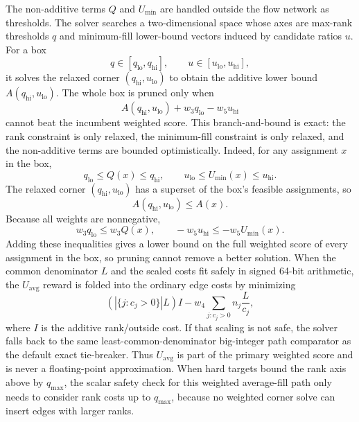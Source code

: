 \documentclass[11pt,a4paper]{article}
\begin{document}
The non-additive terms \(Q\) and \(U_{\min}\) are handled outside the flow
network as thresholds.  The solver searches a two-dimensional space whose
axes are max-rank thresholds \(q\) and minimum-fill lower-bound vectors
induced by candidate ratios \(u\).  For a box
\[
  q\in[q_{\mathrm{lo}},q_{\mathrm{hi}}],
  \qquad
  u\in[u_{\mathrm{lo}},u_{\mathrm{hi}}],
\]
it solves the relaxed corner \((q_{\mathrm{hi}},u_{\mathrm{lo}})\) to obtain
the additive lower bound \(A(q_{\mathrm{hi}},u_{\mathrm{lo}})\).  The whole
box is pruned only when
\[
  A(q_{\mathrm{hi}},u_{\mathrm{lo}})
  + w_3q_{\mathrm{lo}} - w_5u_{\mathrm{hi}}
\]
cannot beat the incumbent weighted score.  This branch-and-bound is exact:
the rank constraint is only relaxed, the minimum-fill constraint is only
relaxed, and the non-additive terms are bounded optimistically.
Indeed, for any assignment \(x\) in the box,
\[
  q_{\mathrm{lo}}\le Q(x)\le q_{\mathrm{hi}},\qquad
  u_{\mathrm{lo}}\le U_{\min}(x)\le u_{\mathrm{hi}}.
\]
The relaxed corner \((q_{\mathrm{hi}},u_{\mathrm{lo}})\) has a superset of the
box's feasible assignments, so
\[
  A(q_{\mathrm{hi}},u_{\mathrm{lo}})\le A(x).
\]
Because all weights are nonnegative,
\[
  w_3 q_{\mathrm{lo}}\le w_3 Q(x),
  \qquad
  -w_5 u_{\mathrm{hi}}\le -w_5 U_{\min}(x).
\]
Adding these inequalities gives a lower bound on the full weighted score of
every assignment in the box, so pruning cannot remove a better solution.
When the common denominator \(L\) and the scaled costs fit safely in signed
64-bit arithmetic, the \(U_{\mathrm{avg}}\) reward is folded into the ordinary
edge costs by minimizing
\[
  (|\{j:c_j>0\}|L)I - w_4\sum_{j:c_j>0} n_j\frac{L}{c_j},
\]
where \(I\) is the additive rank/outside cost.  If that scaling is not safe,
the solver falls back to the same least-common-denominator big-integer path
comparator as the default exact tie-breaker.  Thus \(U_{\mathrm{avg}}\) is part
of the primary weighted score and is never a floating-point approximation.
When hard targets bound the rank axis above by \(q_{\max}\), the scalar
safety check for this weighted average-fill path only needs to consider rank
costs up to \(q_{\max}\), because no weighted corner solve can insert edges
with larger ranks.
\end{document}
